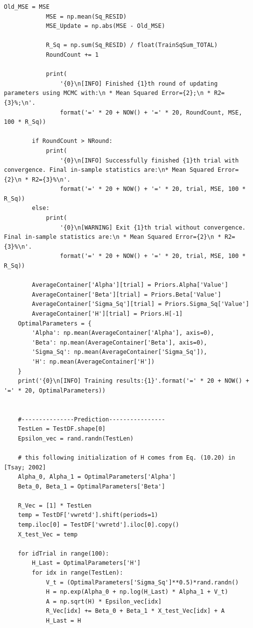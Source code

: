 \documentclass[letterpaper]{article}
\begin{document}
\begin{lstlisting}[label=lst:pythoncode]
            Old_MSE = MSE
            MSE = np.mean(Sq_RESID)
            MSE_Update = np.abs(MSE - Old_MSE)

            R_Sq = np.sum(Sq_RESID) / float(TrainSqSum_TOTAL)
            RoundCount += 1

            print(
                '{0}\n[INFO] Finished {1}th round of updating parameters using MCMC with:\n * Mean Squared Error={2};\n * R2={3}%;\n'.
                format('=' * 20 + NOW() + '=' * 20, RoundCount, MSE, 100 * R_Sq))

        if RoundCount > NRound:
            print(
                '{0}\n[INFO] Successfully finished {1}th trial with convergence. Final in-sample statistics are:\n* Mean Squared Error={2}\n * R2={3}%\n'.
                format('=' * 20 + NOW() + '=' * 20, trial, MSE, 100 * R_Sq))
        else:
            print(
                '{0}\n[WARNING] Exit {1}th trial without convergence. Final in-sample statistics are:\n * Mean Squared Error={2}\n * R2={3}%\n'.
                format('=' * 20 + NOW() + '=' * 20, trial, MSE, 100 * R_Sq))

        AverageContainer['Alpha'][trial] = Priors.Alpha['Value']
        AverageContainer['Beta'][trial] = Priors.Beta['Value']
        AverageContainer['Sigma_Sq'][trial] = Priors.Sigma_Sq['Value']
        AverageContainer['H'][trial] = Priors.H[-1]
    OptimalParameters = {
        'Alpha': np.mean(AverageContainer['Alpha'], axis=0),
        'Beta': np.mean(AverageContainer['Beta'], axis=0),
        'Sigma_Sq': np.mean(AverageContainer['Sigma_Sq']),
        'H': np.mean(AverageContainer['H'])
    }
    print('{0}\n[INFO] Training results:{1}'.format('=' * 20 + NOW() + '=' * 20, OptimalParameters))


    #---------------Prediction----------------
    TestLen = TestDF.shape[0]
    Epsilon_vec = rand.randn(TestLen)

    # this following initialization of H comes from Eq. (10.20) in [Tsay; 2002]
    Alpha_0, Alpha_1 = OptimalParameters['Alpha']
    Beta_0, Beta_1 = OptimalParameters['Beta']

    R_Vec = [1] * TestLen
    temp = TestDF['vwretd'].shift(periods=1)
    temp.iloc[0] = TestDF['vwretd'].iloc[0].copy()
    X_test_Vec = temp

    for idTrial in range(100):
        H_Last = OptimalParameters['H']
        for idx in range(TestLen):
            V_t = (OptimalParameters['Sigma_Sq']**0.5)*rand.randn()
            H = np.exp(Alpha_0 + np.log(H_Last) * Alpha_1 + V_t)
            A = np.sqrt(H) * Epsilon_vec[idx]
            R_Vec[idx] += Beta_0 + Beta_1 * X_test_Vec[idx] + A
            H_Last = H


\end{lstlisting}
\end{document}
